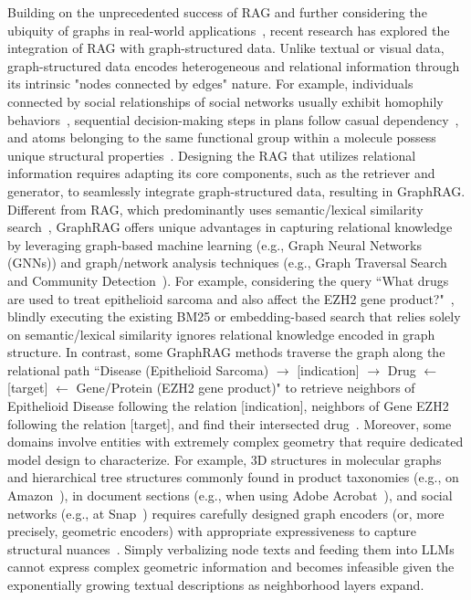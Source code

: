 Building on the unprecedented success of RAG and further considering the ubiquity of graphs in real-world applications~\cite{zhang2020deep}, recent research has explored the integration of RAG with graph-structured data. Unlike textual or visual data, graph-structured data encodes heterogeneous and relational information through its intrinsic "nodes connected by edges" nature. For example, individuals connected by social relationships of social networks usually exhibit homophily behaviors~\cite{mcpherson2001birds}, sequential decision-making steps in plans follow casual dependency~\cite{wu2024can}, and atoms belonging to the same functional group within a molecule possess unique structural properties~\cite{ertl2017algorithm, zang2023hierarchical}. Designing the RAG that utilizes relational information requires adapting its core components, such as the retriever and generator, to seamlessly integrate graph-structured data, resulting in GraphRAG. Different from RAG, which predominantly uses semantic/lexical similarity search~\cite{fan2024survey, gao2023retrieval}, GraphRAG offers unique advantages in capturing relational knowledge by leveraging graph-based machine learning (e.g., Graph Neural Networks (GNNs)) and graph/network analysis techniques (e.g., Graph Traversal Search and Community Detection~\cite{edge2024local, wang2024knowledge}). For example, considering the query ``What drugs are used to treat epithelioid sarcoma and also affect the EZH2 gene product?"~\cite{wu2024stark}, blindly executing the existing BM25 or embedding-based search that relies solely on semantic/lexical similarity ignores relational knowledge encoded in graph structure. In contrast, some GraphRAG methods traverse the graph along the relational path ``Disease (Epithelioid Sarcoma) $\rightarrow$ [indication] $\rightarrow$ Drug $\leftarrow$ [target] $\leftarrow$ Gene/Protein (EZH2 gene product)" to retrieve neighbors of Epithelioid Disease following the relation [indication], neighbors of Gene EZH2 following the relation [target], and find their intersected drug~\cite{jin2024graph, luoreasoning, wang2024knowledge}. Moreover, some domains involve entities with extremely complex geometry that require dedicated model design to characterize.
For example, 3D structures in molecular graphs~\cite{chen2025graph, wigh2022review} and hierarchical tree structures commonly found in product taxonomies (e.g., on Amazon~\cite{zhang2021deep}), in document sections (e.g., when using Adobe Acrobat~\cite{zhang2024tree}), and social networks (e.g., at Snap~\cite{ma2024harec}) requires carefully designed graph encoders (or, more precisely, geometric encoders) with appropriate expressiveness to capture structural nuances~\cite{ma2024harec, zhang2024hierarchical}. Simply verbalizing node texts and feeding them into LLMs cannot express complex geometric information and becomes infeasible given the exponentially growing textual descriptions as neighborhood layers expand. 



